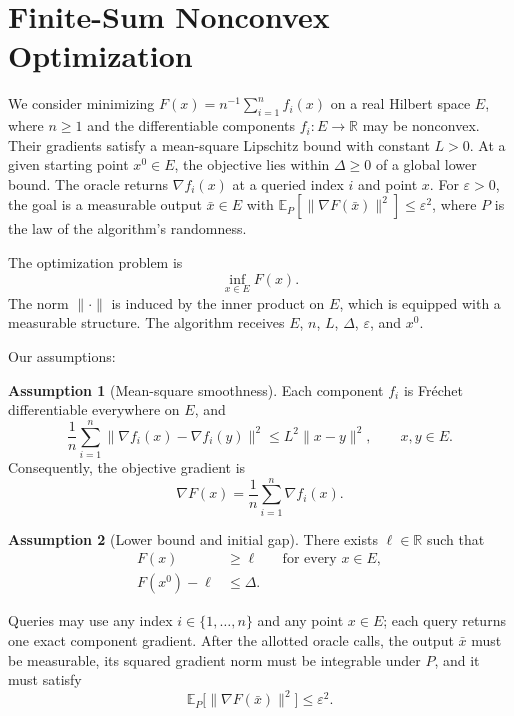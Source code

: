 \documentclass[10pt]{article}
\theoremstyle{definition}
\newtheorem{assumption}{Assumption}
\begin{document}
\section*{Finite-Sum Nonconvex Optimization}
We consider minimizing $F(x)=n^{-1}\sum_{i=1}^n f_i(x)$ on a real Hilbert space $E$, where $n\geq1$ and the differentiable components $f_i:E\to\mathbb{R}$ may be nonconvex. Their gradients satisfy a mean-square Lipschitz bound with constant $L>0$. At a given starting point $x^0\in E$, the objective lies within $\Delta\geq0$ of a global lower bound. The oracle returns $\nabla f_i(x)$ at a queried index $i$ and point $x$. For $\varepsilon>0$, the goal is a measurable output $\bar{x}\in E$ with $\mathbb{E}_{P}[\|\nabla F(\bar{x})\|^2]\leq\varepsilon^2$, where $P$ is the law of the algorithm's randomness.

The optimization problem is
\[
\inf_{x\in E} F(x).
\]
The norm $\|\cdot\|$ is induced by the inner product on $E$, which is equipped with a measurable structure. The algorithm receives $E$, $n$, $L$, $\Delta$, $\varepsilon$, and $x^0$.

Our assumptions:
\begin{assumption}[Mean-square smoothness]
Each component $f_i$ is Fr\'echet differentiable everywhere on $E$, and
\[
\frac{1}{n}\sum_{i=1}^n
\|\nabla f_i(x)-\nabla f_i(y)\|^2
\leq L^2\|x-y\|^2,
\qquad x,y\in E.
\]
Consequently, the objective gradient is
\[
\nabla F(x)=\frac{1}{n}\sum_{i=1}^n\nabla f_i(x).
\]
\end{assumption}

\begin{assumption}[Lower bound and initial gap]
There exists $\ell\in\mathbb{R}$ such that
\[
\begin{aligned}
F(x)&\geq\ell &&\text{for every }x\in E,\\
F(x^0)-\ell&\leq\Delta.
\end{aligned}
\]
\end{assumption}

Queries may use any index $i\in\{1,\ldots,n\}$ and any point $x\in E$; each query returns one exact component gradient. After the allotted oracle calls, the output $\bar{x}$ must be measurable, its squared gradient norm must be integrable under $P$, and it must satisfy
\[
\mathbb{E}_{P}\bigl[\|\nabla F(\bar{x})\|^2\bigr]
\leq\varepsilon^2.
\]
\end{document}
